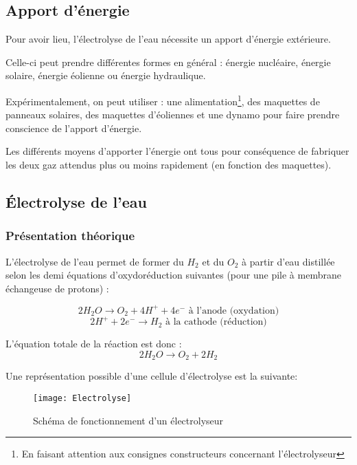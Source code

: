 \documentclass[a4paper, 11pt, twoside]{article}
\numberwithin{equation}{subsection}
\newcommand{\couleur}[1]{\ifbool{Couleur}{\color{#1}}{}}
\newcounter{th}\newcommand{\Thm}[2][]{\couleur{brown}\vspace{3ex}\boxput*(-0.4,1){\setlength{\fboxsep}{0pt}\colorbox{white}{\setlength{\fboxsep}{1ex}\Ovalbox{{\textsc{\ifstrequal{#1}{}{Théorème \stepcounter{th} \theth \phantom{}}{Théorème \stepcounter{th} \theth \phantom{} : #1}}}}}}{\setlength{\fboxsep}{7mm}\doublebox{\noindent \begin{minipage}{0.95\linewidth}\vspace{1ex}#2\end{minipage}}}\vspace{1ex}\couleur{black}}
\begin{document}
	\subsection{Apport d'énergie}
	
	Pour avoir lieu, l'électrolyse de l'eau nécessite un apport d'énergie extérieure. 
	
	Celle-ci peut prendre différentes formes en général : énergie nucléaire, énergie solaire, énergie éolienne ou énergie hydraulique.
	
	Expérimentalement, on peut utiliser : une alimentation\footnote{En faisant attention aux consignes constructeurs concernant l'électrolyseur}, des maquettes de panneaux solaires, des maquettes d'éoliennes et une dynamo pour faire prendre conscience de l'apport d'énergie.
	
	Les différents moyens d'apporter l'énergie ont tous pour conséquence de fabriquer les deux gaz attendus plus ou moins rapidement (en fonction des maquettes).
	
	\subsection{Électrolyse de l'eau}
	\subsubsection{Présentation théorique}
	L'électrolyse de l'eau permet de former du $H_2$ et du $O_2$ à partir d'eau distillée selon les demi équations d'oxydoréduction suivantes (pour une pile à membrane échangeuse de protons) \cite[Page 26]{These}:
	
	\begin{equation}
		2H_2O \rightarrow O_2 + 4H^+ + 4e^- \textrm{ à l'anode (oxydation)}
	\end{equation}
	\begin{equation}
		2H^+ + 2e^- \rightarrow H_2 \textrm{ à la cathode (réduction)}
	\end{equation}
	
	L'équation totale de la réaction est donc :
	\begin{equation}
		2H_2O \rightarrow O_2 + 2H_2
	\end{equation}
	
	Une représentation possible d'une cellule d'électrolyse est la suivante:
	\begin{figure}[!h]
		\begin{center}
			\texttt{[image: Electrolyse]}
			\caption{Schéma de fonctionnement d'un électrolyseur}
			\label{Electrolyse}
		\end{center}
	\end{figure}
	
\end{document}
